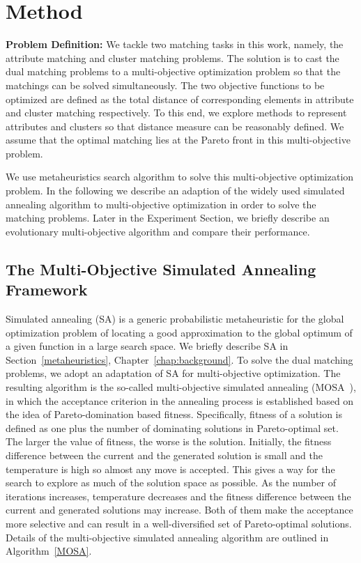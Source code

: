 \section{Method}
\textbf{Problem Definition:} We tackle two matching tasks in this work, namely, the attribute matching and cluster matching problems. The solution is to cast the dual matching problems to a multi-objective optimization problem so that the matchings can be solved simultaneously. The two objective functions to be optimized are defined as the total distance of corresponding elements in attribute and cluster matching respectively. To this end, we explore methods to represent attributes and clusters so that distance measure can be reasonably defined. We assume that the optimal matching lies at the Pareto front in this multi-objective problem.

We use metaheuristics search algorithm to solve this multi-objective optimization problem. In the following we describe an adaption of the widely used simulated annealing algorithm to multi-objective optimization in order to solve the matching problems. Later in the Experiment Section, we briefly describe an evolutionary multi-objective algorithm and compare their performance.

\subsection{The Multi-Objective Simulated Annealing Framework}
Simulated annealing (SA) is a generic probabilistic metaheuristic for the global optimization problem of locating a good approximation to the global optimum of a given function in a large search space. We briefly describe SA in Section~\ref{metaheuristics}, Chapter~\ref{chap:background}. To solve the dual matching problems, we adopt an adaptation of SA for multi-objective optimization. The resulting algorithm is the so-called multi-objective simulated annealing (MOSA~\cite{Suman2003}), in which the acceptance criterion in the annealing process is established based on the idea of Pareto-domination based fitness. Specifically, fitness of a solution is defined as one plus the number of dominating solutions in Pareto-optimal set. The larger the value of fitness, the worse is the solution. Initially, the fitness difference between the current and the generated solution is small and the temperature is high so almost any move is accepted. This gives a way for the search to explore as much of the solution space as possible. As the number of iterations increases, temperature decreases and the fitness difference between the current and generated solutions may increase. Both of them make the acceptance more selective and can result in a well-diversified set of Pareto-optimal solutions. Details of the multi-objective simulated annealing algorithm are outlined in Algorithm~\ref{MOSA}.


